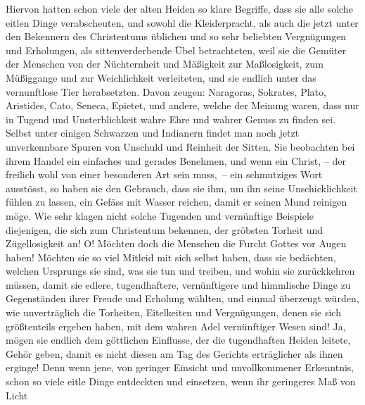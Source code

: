 Hiervon hatten schon viele der alten Heiden so klare
Begriffe, dass sie alle
solche eitlen Dinge verabscheuten, und sowohl die Kleiderpracht, als auch die
jetzt unter den Bekennern des Christentums üblichen und so sehr beliebten
Vergnügungen und Erholungen, als sittenverderbende Übel betrachteten, weil sie
die Gemüter der Menschen von der Nüchternheit und Mäßigkeit zur
Maßlosigkeit, zum
Müßiggange und zur Weichlichkeit verleiteten, und sie
endlich
unter das
vernunftlose Tier herabsetzten. Davon zeugen:
Naragoras, Sokrates,
Plato,
Aristides, Cato,
Seneca,
Epietet, und andere, welche der Meinung waren, dass nur
in
Tugend und Unsterblichkeit wahre Ehre und wahrer
Genuss zu finden sei. Selbst
unter einigen Schwarzen
 und Indianern findet man noch
jetzt unverkennbare
Spuren
von Unschuld und Reinheit der Sitten. Sie beobachten bei ihrem Handel ein
einfaches und gerades Benehmen, und wenn ein Christ, --
der freilich wohl von
einer besonderen Art sein muss,~-- ein schmutziges Wort ausstösst, so haben sie
den
Gebrauch, dass sie ihm, um ihn seine Unschicklichkeit fühlen zu lassen, ein
Gefäss mit Wasser reichen, damit er seinen Mund reinigen möge. Wie sehr klagen
nicht solche Tugenden und vernünftige Beispiele diejenigen, die sich zum
Christentum bekennen, der gröbsten Torheit und Zügellosigkeit an! O! Möchten
doch die Menschen die Furcht Gottes vor Augen haben! Möchten sie so viel Mitleid
mit sich selbst haben, dass sie bedächten, welchen Ursprungs sie sind, was sie
tun und treiben, und wohin sie zurückkehren müssen, damit sie edlere,
tugendhaftere, vernünftigere und himmlische Dinge zu Gegenständen ihrer Freude
und Erholung wählten, und einmal überzeugt würden, wie unverträglich die
Torheiten, Eitelkeiten und Vergnügungen, denen sie sich größtenteils ergeben
haben, mit dem wahren Adel vernünftiger Wesen sind! Ja, mögen sie endlich dem
göttlichen Einflusse, der die tugendhaften
Heiden leitete,
Gehör geben,
damit es nicht diesen am Tag des Gerichts erträglicher
als ihnen erginge! Denn
wenn jene, von geringer Einsicht und unvollkommener Erkenntnis, schon so viele
eitle Dinge entdeckten und einsetzen, wenn ihr geringeres Maß von Licht
